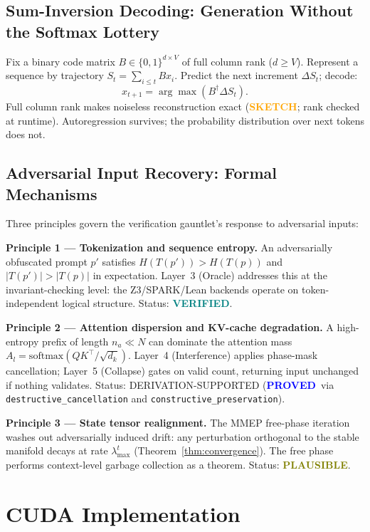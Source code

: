\documentclass[11pt,letterpaper]{article}
\newcommand{\PROVED}{\textbf{\textcolor{blue}{PROVED}}}
\newcommand{\VERIFIED}{\textbf{\textcolor{teal}{VERIFIED}}}
\newcommand{\SKETCH}{\textbf{\textcolor{orange}{SKETCH}}}
\newcommand{\PLAUSIBLE}{\textbf{\textcolor{olive}{PLAUSIBLE}}}
\begin{document}
\subsection{Sum-Inversion Decoding: Generation Without the Softmax Lottery}

Fix a binary code matrix $B \in \{0,1\}^{d \times V}$ of full column rank
($d \geq V$).  Represent a sequence by trajectory $S_t = \sum_{i \leq t} B x_i$.
Predict the next increment $\Delta S_t$; decode:
\[
x_{t+1} = \arg\max\!\left(B^\dagger \Delta S_t\right).
\]
Full column rank makes noiseless reconstruction exact (\SKETCH; rank checked at
runtime).  Autoregression survives; the probability distribution over next
tokens does not.

\subsection{Adversarial Input Recovery: Formal Mechanisms}

Three principles govern the verification gauntlet's response to adversarial inputs:

\textbf{Principle 1 --- Tokenization and sequence entropy.}
An adversarially obfuscated prompt $p'$ satisfies
$H(T(p')) > H(T(p))$ and $|T(p')| > |T(p)|$ in expectation.
Layer~3 (Oracle) addresses this at the invariant-checking level:
the Z3/SPARK/Lean backends operate on token-independent logical structure.
Status: \VERIFIED.

\textbf{Principle 2 --- Attention dispersion and KV-cache degradation.}
A high-entropy prefix of length $n_a \ll N$ can dominate the attention mass
$A_l = \mathrm{softmax}(QK^\top/\sqrt{d_k})$.
Layer~4 (Interference) applies phase-mask cancellation; Layer~5 (Collapse)
gates on valid count, returning input unchanged if nothing validates.
Status: DERIVATION-SUPPORTED (\PROVED\ via
\texttt{destructive\_cancellation} and \texttt{constructive\_preservation}).

\textbf{Principle 3 --- State tensor realignment.}
The MMEP free-phase iteration washes out adversarially induced drift: any
perturbation orthogonal to the stable manifold decays at rate $\lambda_{\max}^t$
(Theorem~\ref{thm:convergence}).  The free phase performs context-level garbage
collection as a theorem.
Status: \PLAUSIBLE.

\section{CUDA Implementation}
\label{sec:cuda}
\end{document}
